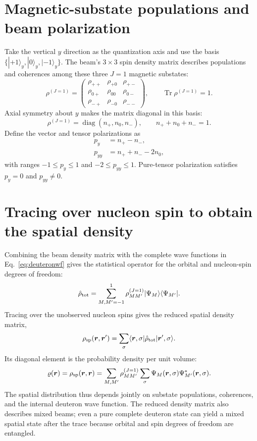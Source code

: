 \documentclass[11pt,a4paper]{article}
\newcommand{\Tr}{\operatorname{Tr}}
\begin{document}
\section{Magnetic-substate populations and beam polarization}

Take the vertical $y$ direction as the quantization axis and use the basis
$\{|+1\rangle_y,|0\rangle_y,|-1\rangle_y\}$.
The beam's $3\times3$ spin density matrix describes populations and
coherences among these three $J=1$ magnetic substates:
\begin{equation}
\rho^{(J=1)}
=
\begin{pmatrix}
\rho_{++} & \rho_{+0} & \rho_{+-}\\
\rho_{0+} & \rho_{00} & \rho_{0-}\\
\rho_{-+} & \rho_{-0} & \rho_{--}
\end{pmatrix},
\qquad
\Tr\rho^{(J=1)}=1.
\label{eq:spinrho}
\end{equation}
Axial symmetry about $y$ makes the matrix diagonal in this basis:
\begin{equation}
\rho^{(J=1)}=\operatorname{diag}(n_+,n_0,n_-),
\qquad n_++n_0+n_-=1.
\end{equation}
Define the vector and tensor polarizations as
\begin{align}
p_y &= n_+-n_-,\\
p_{yy} &= n_++n_--2n_0,
\label{eq:polarization}
\end{align}
with ranges $-1\le p_y\le1$ and $-2\le p_{yy}\le1$.
Pure-tensor polarization satisfies $p_y=0$ and $p_{yy}\ne0$.

\section{Tracing over nucleon spin to obtain the spatial density}

Combining the beam density matrix with the complete wave functions in
Eq.~\eqref{eq:deuteronwf} gives the statistical operator for the orbital
and nucleon-spin degrees of freedom:
\begin{equation}
\hat\rho_{\rm tot}
=
\sum_{M,M'=-1}^{1}
\rho_{MM'}^{(J=1)}|\Psi_M\rangle\langle\Psi_{M'}|.
\label{eq:fullrho}
\end{equation}
Tracing over the unobserved nucleon spins gives the reduced spatial
density matrix,
\begin{equation}
\rho_{\rm sp}(\bm r,\bm r')
=
\sum_\sigma
\langle\bm r,\sigma|\hat\rho_{\rm tot}|\bm r',\sigma\rangle.
\label{eq:reduced}
\end{equation}
Its diagonal element is the probability density per unit volume:
\begin{equation}
\varrho(\bm r)
=
\rho_{\rm sp}(\bm r,\bm r)
=
\sum_{M,M'}\rho_{MM'}^{(J=1)}
\sum_\sigma\Psi_M(\bm r,\sigma)\Psi_{M'}^*(\bm r,\sigma).
\label{eq:localdensity}
\end{equation}
The spatial distribution thus depends jointly on substate populations,
coherences, and the internal deuteron wave function.
The reduced density matrix also describes mixed beams; even a pure
complete deuteron state can yield a mixed spatial state after the trace
because orbital and spin degrees of freedom are entangled.
\end{document}
